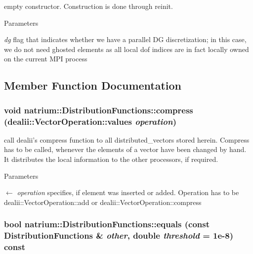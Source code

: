 empty constructor. Construction is done through reinit. 
\begin{DoxyParams}{Parameters}
\item[{\em dg}]flag that indicates whether we have a parallel DG discretization; in this case, we do not need ghosted elements as all local dof indices are in fact locally owned on the current MPI process \end{DoxyParams}


\subsection{Member Function Documentation}
\hypertarget{classnatrium_1_1DistributionFunctions_a5b0afbafe841922dd3f949cc315b5533}{
\subsubsection[{compress}]{\setlength{\rightskip}{0pt plus 5cm}void natrium::DistributionFunctions::compress (dealii::VectorOperation::values {\em operation})}}
\label{classnatrium_1_1DistributionFunctions_a5b0afbafe841922dd3f949cc315b5533}


call dealii's compress function to all distributed\_\-vectors stored herein. Compress has to be called, whenever the elements of a vector have been changed by hand. It distributes the local information to the other processors, if required. 
\begin{DoxyParams}{Parameters}
\item[\mbox{$\leftarrow$} {\em operation}]specifies, if element was inserted or added. Operation has to be dealii::VectorOperation::add or dealii::VectorOperation::compress \end{DoxyParams}
\hypertarget{classnatrium_1_1DistributionFunctions_af7132264087f7000ffe8b191210b4552}{
\subsubsection[{equals}]{\setlength{\rightskip}{0pt plus 5cm}bool natrium::DistributionFunctions::equals (const {\bf DistributionFunctions} \& {\em other}, \/  double {\em threshold} = {\ttfamily 1e-\/8}) const}}
\label{classnatrium_1_1DistributionFunctions_af7132264087f7000ffe8b191210b4552}



